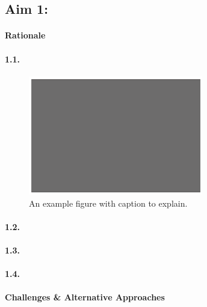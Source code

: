 \newcommand{\FigInc}{%
\begin{figure}
  \begin{mdframed}
  \includegraphics[width=3.0in]{./Figures/Figure.pdf}
  \caption{An example figure with caption to explain.}
  \label{incFigure}
  \end{mdframed}
\end{figure}}

\subsection{Aim 1: \SpecificAimOne}

\paragraph{Rationale}

\lipsum[1-1]

\paragraph{1.1. \SpecificAimOneA}

\FigInc
\lipsum[2-2]

\paragraph{1.2. \SpecificAimOneB}

\lipsum[3-3]

\paragraph{1.3. \SpecificAimOneC}

\lipsum[4-4]

\paragraph{1.4. \SpecificAimOneD}

\lipsum[5-5]

\paragraph{Challenges \& Alternative Approaches}

\lipsum[6-6]
